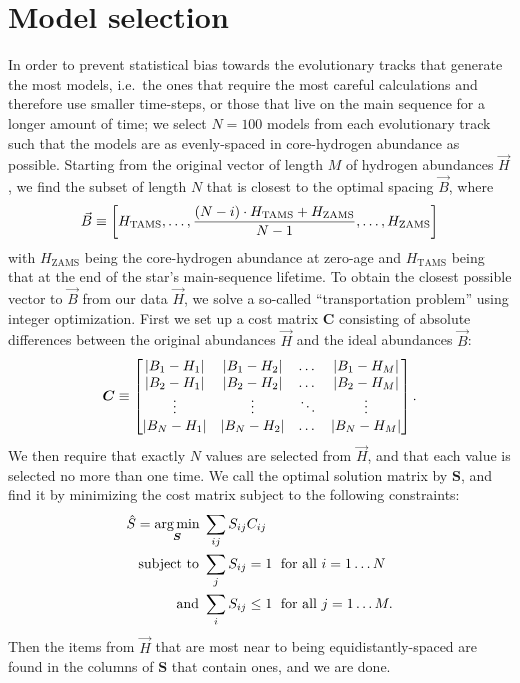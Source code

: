 \documentclass[a4paper,fleqn,usenatbib,useAMS]{mnras}
\begin{document}
\section{Model selection}
\label{sec:selection}

In order to prevent statistical bias towards the evolutionary tracks that generate the most models, i.e.~the ones that require the most careful calculations and therefore use smaller time-steps, or those that live on the main sequence for a longer amount of time; we select $N=100$ models from each evolutionary track such that the models are as evenly-spaced in core-hydrogen abundance as possible. Starting from the original vector of length $M$ of hydrogen abundances $\vec H$, we find the subset of length $N$ that is closest to the optimal spacing $\vec B$, where
\begin{equation}
  \vec B \equiv \qty[
    H_{\text{TAMS}}, 
    \ldots,
    \frac{(N-i)\cdot H_{\text{TAMS}}+H_{\text{ZAMS}}}{N-1}, 
    \ldots, 
    H_{\text{ZAMS}}
  ]
\end{equation}
with $H_{\text{ZAMS}}$ being the core-hydrogen abundance at zero-age and $H_{\text{TAMS}}$ being that at the end of the star's main-sequence lifetime. To obtain the closest possible vector to $\vec B$ from our data $\vec H$, we solve a so-called ``transportation problem'' using integer optimization. First we set up a cost matrix $\boldsymbol{C}$ consisting of absolute differences between the original abundances $\vec H$ and the ideal abundances $\vec B$:
\begin{equation}
  \boldsymbol C \equiv 
  \begin{bmatrix}
    \abs{B_1-H_1} & \abs{B_1-H_2} & \dots & \abs{B_1-H_M} \\ 
    \abs{B_2-H_1} & \abs{B_2-H_2} & \dots & \abs{B_2-H_M} \\ 
    \vdots & \vdots & \ddots & \vdots\\ 
    \abs{B_N-H_1} & \abs{B_N-H_2} & \dots & \abs{B_N-H_M}
  \end{bmatrix}.
\end{equation}
We then require that exactly $N$ values are selected from $\vec H$, and that each value is selected no more than one time. We call the optimal solution matrix by $\boldsymbol S$, and find it by minimizing the cost matrix subject to the following constraints:
\begin{align}
  \hat S = \underset{\boldsymbol S}{\arg\min} \; & \sum_{ij} S_{ij} C_{ij} \notag\\
  \text{subject to } & \sum_j S_{ij} = 1 \; \text{ for all } i=1\ldots N \notag\\
  \text{and } & \sum_i S_{ij} \leq 1 \; \text{ for all } j=1\ldots M.
\end{align}
Then the items from $\vec H$ that are most near to being equidistantly-spaced are found in the columns of $\boldsymbol S$ that contain ones, and we are done. 
\end{document}
